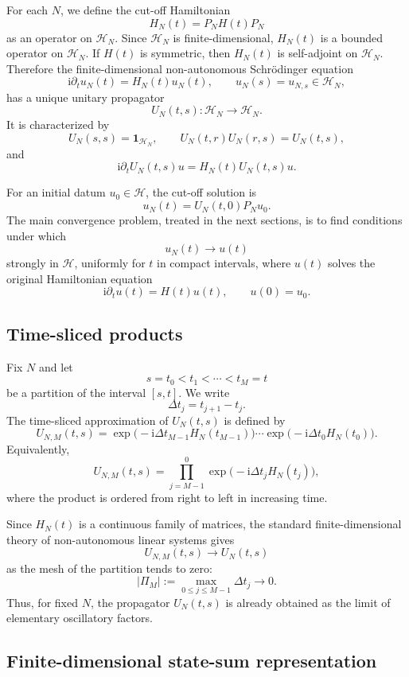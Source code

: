 \documentclass[10pt,a4paper]{amsart}
\newcommand{\Hilb}{\mathcal H}
\newcommand{\Id}{\mathbf 1}
\newcommand{\ii}{\mathrm i}
\begin{document}
For each \(N\), we define the cut-off Hamiltonian
\[
        H_N(t)=P_NH(t)P_N
\]
as an operator on \(\Hilb_N\).  Since \(\Hilb_N\) is finite-dimensional,
\(H_N(t)\) is a bounded operator on \(\Hilb_N\).  If \(H(t)\) is
symmetric, then \(H_N(t)\) is self-adjoint on \(\Hilb_N\).  Therefore
the finite-dimensional non-autonomous Schr\"odinger equation
\[
        \ii\partial_t u_N(t)=H_N(t)u_N(t),
        \qquad
        u_N(s)=u_{N,s}\in \Hilb_N,
\]
has a unique unitary propagator
\[
        U_N(t,s):\Hilb_N\to\Hilb_N.
\]
It is characterized by
\[
        U_N(s,s)=\Id_{\Hilb_N},
        \qquad
        U_N(t,r)U_N(r,s)=U_N(t,s),
\]
and
\[
        \ii\partial_t U_N(t,s)u=H_N(t)U_N(t,s)u.
\]

For an initial datum \(u_0\in\Hilb\), the cut-off solution is
\[
        u_N(t)=U_N(t,0)P_Nu_0.
\]
The main convergence problem, treated in the next sections, is to find
conditions under which
\[
        u_N(t)\longrightarrow u(t)
\]
strongly in \(\Hilb\), uniformly for \(t\) in compact intervals, where
\(u(t)\) solves the original Hamiltonian equation
\[
        \ii\partial_t u(t)=H(t)u(t),
        \qquad
        u(0)=u_0.
\]

\subsection{Time-sliced products}

Fix \(N\) and let
\[
        s=t_0<t_1<\cdots<t_M=t
\]
be a partition of the interval \([s,t]\).  We write
\[
        \Delta t_j=t_{j+1}-t_j.
\]
The time-sliced approximation of \(U_N(t,s)\) is defined by
\[
        U_{N,M}(t,s)
        =
        \exp\big(-\ii\Delta t_{M-1}H_N(t_{M-1})\big)
        \cdots
        \exp\big(-\ii\Delta t_0H_N(t_0)\big).
\]
Equivalently,
\[
        U_{N,M}(t,s)
        =
        \prod_{j=M-1}^{0}
        \exp\big(-\ii\Delta t_jH_N(t_j)\big),
\]
where the product is ordered from right to left in increasing time.

Since \(H_N(t)\) is a continuous family of matrices, the standard
finite-dimensional theory of non-autonomous linear systems gives
\[
        U_{N,M}(t,s)\longrightarrow U_N(t,s)
\]
as the mesh of the partition tends to zero:
\[
        |\Pi_M|
        :=
        \max_{0\leq j\leq M-1}\Delta t_j
        \longrightarrow0.
\]
Thus, for fixed \(N\), the propagator \(U_N(t,s)\) is already obtained
as the limit of elementary oscillatory factors.

\subsection{Finite-dimensional state-sum representation}
\label{subsec:finite-dimensional-state-sum}
\end{document}
